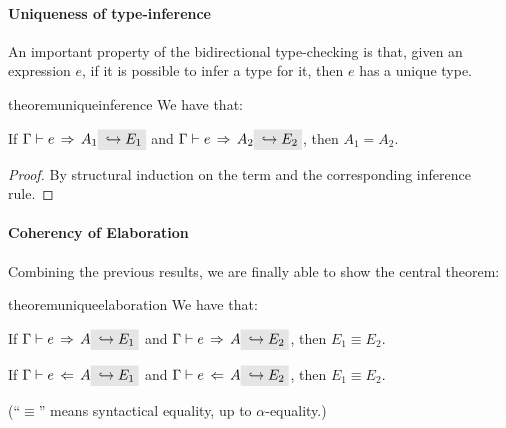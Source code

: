\paragraph{Uniqueness of type-inference}
An important property of the bidirectional type-checking is that, given an expression $e$, if
it is possible to infer a type for it, then $e$ has a unique type.

\begin{restatable}{theorem}{uniqueinference}
  \label{theorem:unique-inference}
  We have that:
  \begin{itemize*}
    \item If $\jinfer \Gamma e {A_1} \yields {E_1}$ and $\jinfer \Gamma e {A_2} \yields
          {E_2}$, then ${A_1} = {A_2}$. 
  \end{itemize*}
\end{restatable}

\begin{proof}
By structural induction on the term and the corresponding inference rule.
\end{proof}


\paragraph{Coherency of Elaboration}
Combining the previous results, we are finally able to show the central theorem:

\begin{restatable}{theorem}{uniqueelaboration}
  \label{theorem:unique-elaboration}
  We have that:
  \begin{itemize*}
    \item If $\jinfer \Gamma e A \yields {E_1}$ and $\jinfer \Gamma e A \yields
          {E_2}$, then $E_1 \equiv E_2$. 
    \item If $\jcheck \Gamma e A \yields {E_1}$ and $\jcheck \Gamma e A \yields
          {E_2}$, then $E_1 \equiv E_2$.
  \end{itemize*}(``$\equiv$'' means syntactical equality, up to
  $\alpha$-equality.)
  

\end{restatable}

